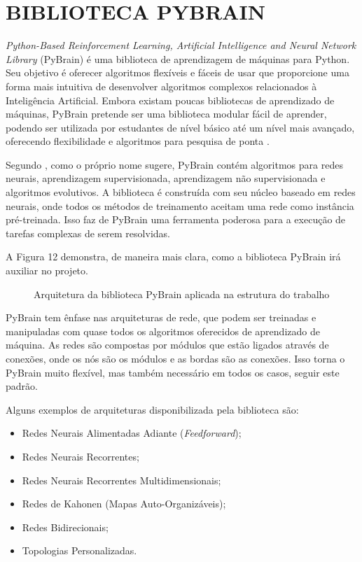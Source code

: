 \section{BIBLIOTECA PYBRAIN}
\textit{Python-Based Reinforcement Learning, Artificial Intelligence and Neural Network Library} (PyBrain) é uma biblioteca de aprendizagem de máquinas para Python. Seu objetivo é oferecer algoritmos flexíveis e fáceis de usar que proporcione uma forma mais intuitiva de desenvolver algoritmos complexos relacionados à Inteligência Artificial. Embora existam poucas bibliotecas de aprendizado de máquinas, PyBrain pretende ser uma biblioteca modular fácil de aprender, podendo ser utilizada por estudantes de nível básico até um nível mais avançado, oferecendo flexibilidade e algoritmos para pesquisa de ponta \cite{pybrain2010}.

Segundo , como o próprio nome sugere, PyBrain contém algoritmos para redes neurais, aprendizagem supervisionada, aprendizagem não supervisionada e algoritmos evolutivos. A biblioteca é construída com seu núcleo baseado em redes neurais, onde todos os métodos de treinamento aceitam uma rede como instância pré-treinada. Isso faz de PyBrain uma ferramenta poderosa para a execução de tarefas complexas de serem resolvidas. 

A Figura 12 demonstra, de maneira mais clara, como a biblioteca PyBrain irá auxiliar no projeto.

\begin{figure}[h]
	\centering
	\caption{Arquitetura da biblioteca PyBrain aplicada na estrutura do trabalho}
	\label{exec-rna-pybrain}
\end{figure}

PyBrain tem ênfase nas arquiteturas de rede, que podem ser treinadas e manipuladas com quase todos os algoritmos oferecidos de aprendizado de máquina. As redes são compostas por módulos que estão ligados através de conexões, onde os nós são os módulos e as bordas são as conexões. Isso torna o PyBrain muito flexível, mas também necessário em todos os casos, seguir este padrão.

Alguns exemplos de arquiteturas disponibilizada pela biblioteca são:

\begin{itemize}
	\item Redes Neurais Alimentadas Adiante (\textit{Feedforward});
	\item Redes Neurais Recorrentes;
	\item Redes Neurais Recorrentes Multidimensionais;
	\item Redes de Kahonen (Mapas Auto-Organizáveis);
	\item Redes Bidirecionais;
	\item Topologias Personalizadas.
\end{itemize}

